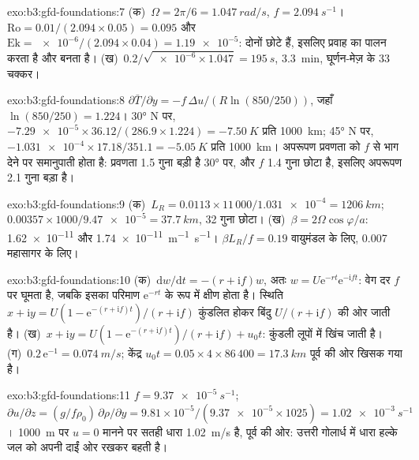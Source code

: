 \begin{solution}{exo:b3:gfd-foundations:7}
(क)~$\Omega = 2\pi/6 = \qty{1.047}{rad/s}$, $f = \qty{2.094}{s^{-1}}$।
$\mathrm{Ro} = 0.01/(2.094\times0.05) = 0.095$ और $\mathrm{Ek} =
\num{e-6}/(2.094\times0.04) = \num{1.19e-5}$: दोनों छोटे हैं, इसलिए प्रवाह
 का पालन करता है और  बनता है। (ख)~$0.2/\sqrt{\num{e-6}
\times1.047} = \qty{195}{s}$, \qty{3.3}{min}, घूर्णन-मेज़ के 33 चक्कर।
\end{solution}

\begin{solution}{exo:b3:gfd-foundations:8}
$\partial\bar T/\partial y = -f\,\Delta u/(R\ln(850/250))$, जहाँ
$\ln(850/250) = 1.224$। \ang{30} N पर, $-\num{7.29e-5}\times36.12/(286.9
\times1.224) = \qty{-7.50}{K}$ प्रति \qty{1000}{km}; \ang{45} N पर,
$-\num{1.031e-4}\times17.18/351.1 = \qty{-5.05}{K}$ प्रति \qty{1000}{km}।
अपरूपण प्रवणता को $f$ से भाग देने पर समानुपाती होता है: प्रवणता 1.5
गुना बड़ी है \ang{30} पर, और $f$ 1.4 गुना छोटा है, इसलिए अपरूपण 2.1 गुना
बड़ा है।
\end{solution}

\begin{solution}{exo:b3:gfd-foundations:9}
(क)~$L_R = 0.0113\times11\,000/\num{1.031e-4} = \qty{1206}{km}$;
$0.00357\times1000/\num{9.47e-5} = \qty{37.7}{km}$, 32 गुना छोटा।
(ख)~$\beta = 2\Omega\cos\varphi/a$: \num{1.62e-11} और
\qty{1.74e-11}{m^{-1}.s^{-1}}। $\beta L_R/f = 0.19$ वायुमंडल के लिए, 0.007
महासागर के लिए।
\end{solution}

\begin{solution}{exo:b3:gfd-foundations:10}
(क)~$\mathrm dw/\mathrm dt = -(r + \mathrm if)w$, अतः $w = U\mathrm
e^{-rt}\mathrm e^{-\mathrm ift}$: वेग दर $f$ पर घूमता है, जबकि
इसका परिमाण $\mathrm e^{-rt}$ के रूप में क्षीण होता है। स्थिति $x + \mathrm iy =
U(1 - \mathrm e^{-(r + \mathrm if)t})/(r + \mathrm if)$ कुंडलित होकर
बिंदु $U/(r + \mathrm if)$ की ओर जाती है। (ख)~$x + \mathrm iy = U(1 - \mathrm e^{-(r +
\mathrm if)t})/(r + \mathrm if) + u_0t$: कुंडली लूपों में खिंच जाती है।
(ग)~$0.2\,\mathrm e^{-1} = \qty{0.074}{m/s}$; केंद्र $u_0t =
0.05\times4\times86\,400 = \qty{17.3}{km}$ पूर्व की ओर खिसक गया है।
\end{solution}

\begin{solution}{exo:b3:gfd-foundations:11}
$f = \qty{9.37e-5}{s^{-1}}$; $\partial u/\partial z = (g/f\rho_0)\,\partial
\rho/\partial y = 9.81\times10^{-5}/(\num{9.37e-5}\times1025) =
\qty{1.02e-3}{s^{-1}}$। \qty{1000}{m} पर $u = 0$ मानने पर सतही धारा
\qty{1.02}{m/s} है, पूर्व की ओर: उत्तरी गोलार्ध में धारा
हल्के जल को अपनी दाईं ओर रखकर बहती है।
\end{solution}

